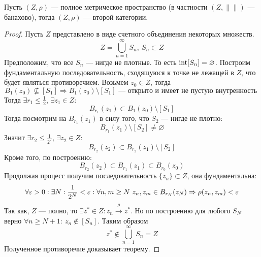 \begin{theorem}[Бэр]\label{th:bear}
	Пусть $(Z, \rho)$ --- полное метрическое пространство (в частности $(Z, \|\|)$ --- банахово), тогда $(Z, \rho)$ --- второй категории.
\end{theorem}
\begin{proof}
	Пусть $Z$ представлено в виде счетного объединения некоторых множеств.
	$$
	Z = \bigcup_{n=1}^\infty S_n , \ S_n \subset Z
	$$
	Предположим, что все $S_n$ --- нигде не плотные. То есть $\operatorname{int} [S_n] = \varnothing$. 
	Построим фундаментальную последовательность, сходящуюся к точке не лежащей в $Z$, что будет являться противоречием. Возьмем $z_0 \in Z$, тогда
	$$
	B_1(z_0) \nsubseteq [S_1] \Rightarrow B_1(z_0)\setminus [S_1] \text{ --- открыто и имеет не пустую внутренность	}
	$$
	Тогда $\exists r_1 \leq \frac{1}{2}$, $\exists z_1 \in Z$:
	$$
	B_{r_1}(z_1) \subset B_1(z_0)\setminus [S_1]
	$$
	Тогда посмотрим на $B_{r_1}(z_1)$ в силу того, что $S_2$ --- нигде не плотно:
	$$
	B_{r_1}(z_1) \setminus [S_2] \neq \varnothing
	$$
	Значит $\exists r_2 \leq \displaystyle \frac{1}{2^2}$, $\exists z_2 \in Z$:
	$$
	B_{r_2}(z_2) \subset B_{r_2}(z_1) \setminus [S_2]
	$$
	Кроме того, по построению:
	$$
	B_{r_2}(z_2) \subset B_{r_1}(z_1) \subset B_{r_0}(z_0)
	$$
	Продолжая процесс получим последовательность $\{z_n\} \subset Z$, она фундаментальна:
	$$
	\forall \varepsilon > 0: \exists N: \frac{1}{2^N} < \varepsilon: \forall n, m \geq N \ z_n,z_m \in B_{r_N}(z_N) \Rightarrow \rho(z_n,z_m) < \varepsilon
	$$ 
	Так как, $Z$ --- полно, то $\exists z^* \in Z: z_n \xrightarrow{\rho} z^*$. Но по построению для любого $S_N$ верно $\forall n \geq N + 1: \ z_n \notin [S_n]$. Таким образом
	$$
	z^* \notin \bigcup_{n=1}^\infty S_n = Z
	$$
	Полученное противоречие доказывает теорему.
\end{proof}